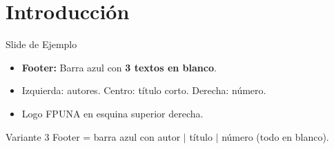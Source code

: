 \documentclass[12pt, aspectratio=169]{beamer}
\begin{document}
\section{Introducci\'on}
\begin{frame}{Slide de Ejemplo}
\begin{itemize}
  \item \textbf{Footer:} Barra azul con \textbf{3 textos en blanco}.
  \item Izquierda: autores. Centro: t\'itulo corto. Derecha: n\'umero.
  \item Logo FPUNA en esquina superior derecha.
\end{itemize}
\begin{block}{Variante 3}
  Footer = barra azul con autor $|$ t\'itulo $|$ n\'umero (todo en blanco).
\end{block}
\end{frame}
\end{document}
